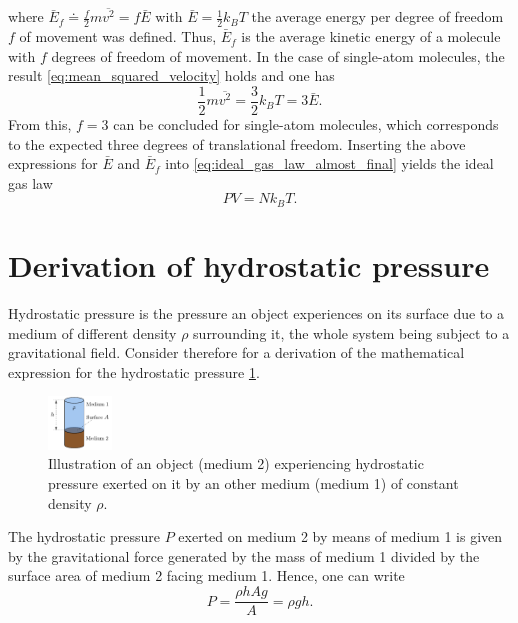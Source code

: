 \documentclass[a4paper,11pt, twocolumn]{article}
\begin{document}
\begin{equation}
\end{equation} where $\bar{E}_f \doteq \frac{f}{2}m\overline{{v^2}} = f\bar{E}$ with $\bar{E} = \frac{1}{2}k_B T$ the average energy per degree of freedom $f$ of movement was defined. Thus, $\bar{E}_f$ is the average kinetic energy of a molecule with $f$ degrees of freedom of movement. In the case of single-atom molecules, the result \cref{eq:mean_squared_velocity} holds and one has \begin{equation}
\frac{1}{2}m\overline{{v^2}} = \frac{3}{2}k_B T = 3\bar{E}.
\end{equation} From this, $f=3$ can be concluded for single-atom molecules, which corresponds to the expected three degrees of translational freedom. Inserting the above expressions for $\bar{E}$ and $\bar{E}_f$ into \cref{eq:ideal_gas_law_almost_final} yields the ideal gas law \begin{equation}
PV = Nk_B T.
\end{equation}


\section{Derivation of hydrostatic pressure}
Hydrostatic pressure is the pressure an object experiences on its surface due to a medium of different density $\rho$ surrounding it, the whole system being subject to a gravitational field. Consider therefore for a derivation of the mathematical expression for the hydrostatic pressure \cref{fig:hydrostatic-pressure-derivation}.
\begin{figure}[h]
	\centering
	\includegraphics[width=0.15\textwidth]{figures/hydrostatic-pressure-derivation.pdf}
	\caption{Illustration of an object (medium 2) experiencing hydrostatic pressure exerted on it by an other medium (medium 1) of constant density $\rho$.}
	\label{fig:hydrostatic-pressure-derivation}
\end{figure}

The hydrostatic pressure $P$ exerted on medium 2 by means of medium 1 is given by the gravitational force generated by the mass of medium 1 divided by the surface area of medium 2 facing medium 1. Hence, one can write \begin{equation}
	P = \frac{\rho h A g}{A}  = \rho g h.
\end{equation}  %
\end{document}
